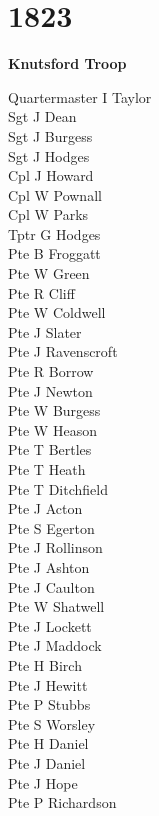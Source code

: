 \chapter*{1823}

\begin{center}
  \Large
  \textbf{Knutsford Troop}
\end{center}

\begin{multicols}{2}
  \noindent
  Quartermaster I Taylor \\
  Sgt J Dean \\
  Sgt J Burgess \\
  Sgt J Hodges \\
  Cpl J Howard \\
  Cpl W Pownall \\
  Cpl W Parks \\
  Tptr G Hodges \\
  Pte B Froggatt \\
  Pte W Green \\
  Pte R Cliff \\
  Pte W Coldwell \\
  Pte J Slater \\
  Pte J Ravenscroft \\
  Pte R Borrow \\
  Pte J Newton \\
  Pte W Burgess \\
  Pte W Heason \\
  Pte T Bertles \\
  Pte T Heath \\
  Pte T Ditchfield \\
  Pte J Acton \\
  Pte S Egerton \\
  Pte J Rollinson \\
  Pte J Ashton \\
  Pte J Caulton \\
  Pte W Shatwell \\
  Pte J Lockett \\
  Pte J Maddock \\
  Pte H Birch \\
  Pte J Hewitt \\
  Pte P Stubbs \\
  Pte S Worsley \\
  Pte H Daniel \\
  Pte J Daniel \\
  Pte J Hope \\
  Pte P Richardson \\

\end{multicols}
